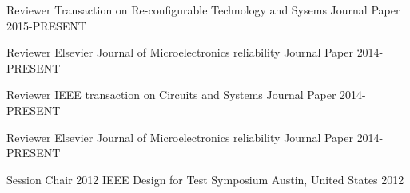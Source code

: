 

\begin{cvhonors}

  \cvhonor
    {Reviewer} %
    {Transaction on Re-configurable Technology and Sysems} %
    {Journal Paper} %
    {2015-PRESENT} %


  \cvhonor
    {Reviewer} %
    {Elsevier Journal of Microelectronics reliability} %
    {Journal Paper} %
    {2014-PRESENT} %

  \cvhonor
    {Reviewer} %
    {IEEE transaction on Circuits and Systems} %
    {Journal Paper} %
    {2014-PRESENT} %

  \cvhonor
    {Reviewer} %
    {Elsevier Journal of Microelectronics reliability} %
    {Journal Paper} %
    {2014-PRESENT} %

  \cvhonor
    {Session Chair} %
    {2012 IEEE Design for Test Symposium} %
    {Austin, United States} %
    {2012} %

\end{cvhonors}
